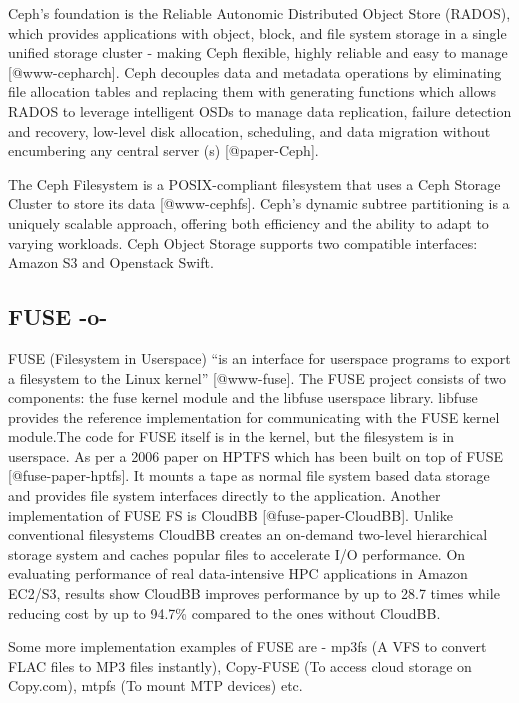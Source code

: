 Ceph's foundation is the Reliable Autonomic Distributed Object Store
(RADOS), which provides applications with object, block, and file
system storage in a single unified storage cluster - making Ceph
flexible, highly reliable and easy to manage [@www-cepharch]. Ceph
decouples data and metadata operations by eliminating file allocation
tables and replacing them with generating functions which allows RADOS
to leverage intelligent OSDs to manage data replication, failure
detection and recovery, low-level disk allocation, scheduling, and
data migration without encumbering any central server
(s) [@paper-Ceph].
 
The Ceph Filesystem is a POSIX-compliant filesystem that uses a Ceph
Storage Cluster to store its data [@www-cephfs]. Ceph's dynamic
subtree partitioning is a uniquely scalable approach, offering both
efficiency and the ability to adapt to varying workloads. Ceph Object
Storage supports two compatible interfaces: Amazon S3 and Openstack
Swift.



\subsection{FUSE -o-}

FUSE (Filesystem in Userspace) ``is an interface for userspace
programs to export a filesystem to the Linux
kernel'' [@www-fuse]. The FUSE project consists of two components:
the fuse kernel module and the libfuse userspace library. libfuse
provides the reference implementation for communicating with the FUSE
kernel module.The code for FUSE itself is in the kernel, but the
filesystem is in userspace.  As per a 2006 paper on HPTFS which has
been built on top of FUSE [@fuse-paper-hptfs]. It mounts a tape as
normal file system based data storage and provides file system
interfaces directly to the application.  Another implementation of
FUSE FS is CloudBB [@fuse-paper-CloudBB]. Unlike conventional
filesystems CloudBB creates an on-demand two-level hierarchical
storage system and caches popular files to accelerate I/O
performance. On evaluating performance of real data-intensive HPC
applications in Amazon EC2/S3, results show CloudBB improves
performance by up to 28.7 times while reducing cost by up to 94.7\%
compared to the ones without CloudBB.

Some more implementation examples of FUSE are - mp3fs (A VFS to
convert FLAC files to MP3 files instantly), Copy-FUSE (To access cloud
storage on Copy.com), mtpfs (To mount MTP devices) etc.



